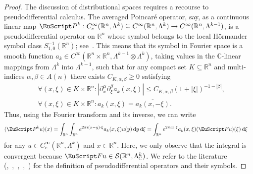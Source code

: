 \documentclass[10pt,a4paper]{amsart}
\theoremstyle{definition}
\theoremstyle{remark}
\numberwithin{equation}{section}
\newcommand{\bbC}{{\mathbb C}}
\newcommand{\bbR}{{\mathbb R}}
\newcommand{\calS}{{\mathcal S}}
\newcommand{\euF}{{\EuScript F}}
\newcommand{\euP}{{\EuScript P}}
\newcommand{\dif}{{\mathrm d}}
\newcommand{\vecnorm}[1]{|#1|}
\newcommand{\Alt}[1]{\Lambda^{#1}}
\newcommand{\Poincare}{\euP}
\newcommand{\Fourier}{{\euF}}
\begin{document}
\begin{proof}
    


    The discussion of distributional spaces requires a recourse to pseudodifferential calculus. 
    The averaged Poincar\'e operator, say, as a continuous linear map 
    $\Poincare^{k} : C^{\infty}_{c}(\bbR^{n},\Alt{k}) \subseteq C^{\infty}(\bbR^{n},\Alt{k}) \to C^{\infty}(\bbR^{n},\Alt{k-1})$,
    is a pseudodifferential operator on $\bbR^{n}$
    whose symbol belongs to the local H\"ormander symbol class $S^{-1}_{1,0}(\bbR^{n})$; see~\cite[Theorem~3.2]{costabel2010}.
    This means that its symbol in Fourier space is a smooth function $a_{k} \in C^{\infty}( \bbR^{n} \times \bbR^{n}, \Alt{k-1} \otimes \Alt{k} )$, taking values in the $\bbC$-linear mappings from $\Alt{k}$ into $\Alt{k-1}$,
    such that for any compact set $K \subseteq \bbR^{n}$ and multi-indices $\alpha, \beta \in A(n)$
    there exists $C_{K,\alpha,\beta} \geq 0$ satisfying  
    \begin{align*}
        &
        \forall (x,\xi) \in K \times \bbR^{n} 
        :
        \vecnorm{ \partial_{x}^{\alpha} \partial_{\xi}^{\beta} a_{k}( x, \xi ) }
        \leq 
        C_{K,\alpha,\beta} 
        \left( 1 + \lvert \xi \rvert \right)^{ - 1 - |\beta| }
        ,
        \\
        &
        \forall (x,\xi) \in K \times \bbR^{n} 
        :
        a_{k}( x, \xi ) = \overline{ a_{k}( x, - \xi ) }
        .
    \end{align*}
    Thus, using the Fourier transform and its inverse, we can write 
    \begin{align*}
        ( \Poincare^{k} u )(x)
        &
        = 
        \int_{\bbR^{n}} \int_{\bbR^{n}} e^{2\pi i (x-y) \cdot \xi} a_{k}(x,\xi) u(y) \,\dif y \,\dif \xi
= 
        \int_{\bbR^{n}} e^{2\pi i x \cdot \xi} a_{k}(x,\xi) (\Fourier u)(\xi) \,\dif \xi   
    \end{align*}
    for any $u \in C^{\infty}_{c}(\bbR^{n},\Alt{k})$ and $x \in \bbR^{n}$. 
    Here, we only observe that the integral is convergent 
    because $\Fourier u \in \calS(\bbR^{n},\Alt{k}_{\bbC})$. 
    We refer to the literature (\cite[Chapter XVIII]{hoermander},~\cite[Definition~7.1]{grubb},~\cite[7.1.4]{taylor2},~\cite[Definition 2.1, Definition 2.3]{treves1},~\cite{wong}) for the definition of pseudodifferential operators and their symbols. 
    

\end{proof}
\end{document}
